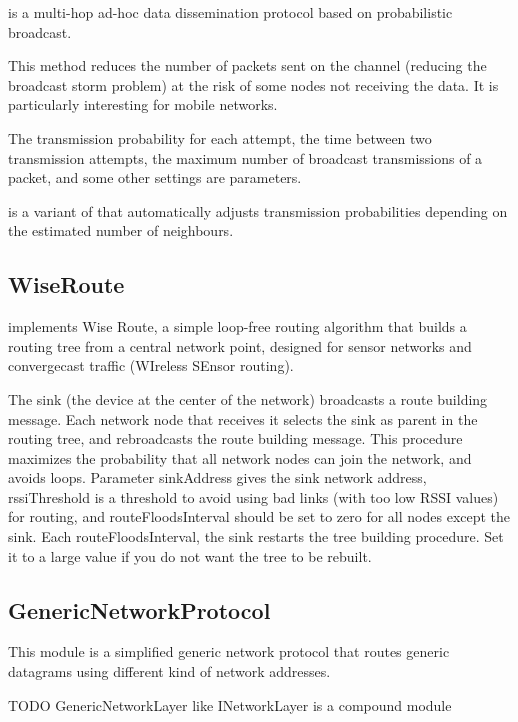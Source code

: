  is a multi-hop ad-hoc data dissemination 
protocol based on probabilistic broadcast.

This method reduces the number of packets sent on the channel (reducing the
broadcast storm problem) at the risk of some nodes not receiving the data.
It is particularly interesting for mobile networks.

The transmission probability for each attempt, the time between two transmission
attempts, the maximum number of broadcast transmissions of a packet, and
some other settings are parameters.


 is a variant of
 that automatically adjusts transmission
probabilities depending on the estimated number of neighbours.

\subsection{WiseRoute}

 implements Wise Route, a simple loop-free routing algorithm
that builds a routing tree from a central network point, designed for sensor
networks and convergecast traffic (WIreless SEnsor routing).

The sink (the device at the center of the network) broadcasts
a route building message. Each network node that receives it
selects the sink as parent in the routing tree, and rebroadcasts
the route building message. This procedure maximizes the probability
that all network nodes can join the network, and avoids loops.
Parameter sinkAddress gives the sink network address,
rssiThreshold is a threshold to avoid using bad links (with too low
RSSI values) for routing, and routeFloodsInterval should be set to
zero for all nodes except the sink. Each routeFloodsInterval, the
sink restarts the tree building procedure. Set it to a large value
if you do not want the tree to be rebuilt.

\subsection{GenericNetworkProtocol}

This module is a simplified generic network protocol that routes
generic datagrams using different kind of network addresses. 

TODO GenericNetworkLayer like INetworkLayer  is a compound module

